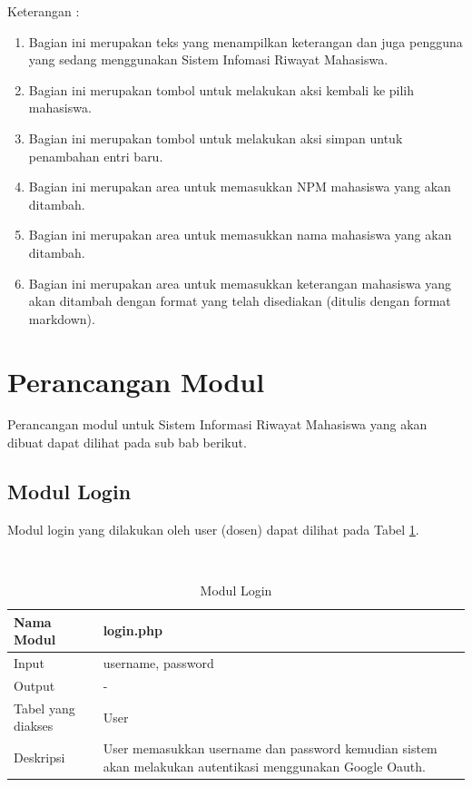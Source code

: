 Keterangan :
\begin{enumerate}[(1)]
\item
Bagian ini merupakan teks yang menampilkan keterangan dan juga pengguna yang sedang menggunakan Sistem Infomasi Riwayat Mahasiswa.
\item
Bagian ini merupakan tombol untuk melakukan aksi kembali ke pilih mahasiswa.
\item
Bagian ini merupakan tombol untuk melakukan aksi simpan untuk penambahan entri baru.
\item
Bagian ini merupakan area untuk memasukkan NPM mahasiswa yang akan ditambah.
\item
Bagian ini merupakan area untuk memasukkan nama mahasiswa yang akan ditambah.
\item
Bagian ini merupakan area  untuk memasukkan keterangan mahasiswa yang akan ditambah dengan format yang telah disediakan (ditulis dengan format markdown).
\end{enumerate}

\section{Perancangan Modul}
\label{sec:perancanganmodul}

Perancangan modul untuk Sistem Informasi Riwayat Mahasiswa yang akan dibuat dapat dilihat pada sub bab berikut.

\subsection{Modul Login}
Modul login yang dilakukan oleh user (dosen) dapat dilihat pada Tabel \ref{tab:modullogin}.

\begin{center}
\begin{table}
\caption[Tabel 4-1 Modul Login]{Modul Login}\\
\label{tab:modullogin}
\begin{center}
\begin{tabular}{ l p{10cm} }
\hline
Nama Modul & login.php\\
\hline
Input & username, password\\
\hline
Output & -\\
\hline
Tabel yang diakses & User\\
\hline
Deskripsi & User memasukkan username dan password kemudian sistem akan melakukan autentikasi menggunakan Google Oauth.\\
\hline
\end{tabular}
\end{center}
\end{table}
\end{center}

